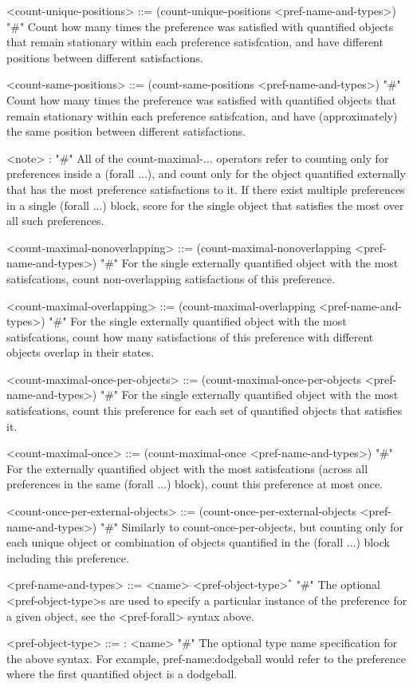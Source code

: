 \documentclass{article}
\begin{document}
\begin{grammar}
<count-unique-positions> ::= (count-unique-positions <pref-name-and-types>) "#" Count how many times the preference was satisfied with quantified objects that remain stationary within each preference satisfcation, and have different positions between different satisfactions.

<count-same-positions> ::= (count-same-positions <pref-name-and-types>) "#" Count how many times the preference was satisfied with quantified objects that remain stationary within each preference satisfcation, and have (approximately) the same position between different satisfactions.

<note> : "#" All of the count-maximal-... operators refer to counting only for preferences inside a (forall ...), and count only for the object quantified externally that has the most preference satisfactions to it. If there exist multiple preferences in a single (forall ...) block, score for the single object that satisfies the most over all such preferences.

<count-maximal-nonoverlapping> ::= (count-maximal-nonoverlapping <pref-name-and-types>) "#" For the single externally quantified object with the most satisfcations, count non-overlapping satisfactions of this preference.

<count-maximal-overlapping> ::= (count-maximal-overlapping <pref-name-and-types>) "#" For the single externally quantified object with the most satisfcations, count how many satisfactions of this preference with different objects overlap in their states.

<count-maximal-once-per-objects> ::= (count-maximal-once-per-objects <pref-name-and-types>) "#" For the single externally quantified object with the most satisfcations, count this preference for each set of quantified objects that satisfies it.

<count-maximal-once> ::= (count-maximal-once <pref-name-and-types>) "#" For the externally quantified object with the most satisfcations (across all preferences in the same (forall ...) block), count this preference at most once.

<count-once-per-external-objects> ::=  (count-once-per-external-objects <pref-name-and-types>) "#" Similarly to count-once-per-objects, but counting only for each unique object or combination of objects quantified in the (forall ...) block including this preference.

<pref-name-and-types> ::= <name> <pref-object-type>$^*$ "#" The optional <pref-object-type>s are used to specify a particular instance of the preference for a given object, see the <pref-forall> syntax above.

    <pref-object-type> ::= : <name>  "#" The optional type name specification for the above syntax. For example, pref-name:dodgeball would refer to the preference where the first quantified object is a dodgeball.




\end{grammar}
\end{document}
